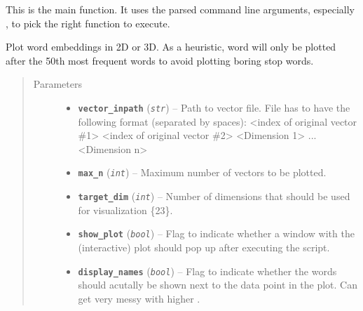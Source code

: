 \documentclass[letterpaper,10pt,english]{sphinxmanual}
\begin{document}

\begin{fulllineitems}
\label{src.eval:src.eval.eval_vectors.main}
This is the main function. It uses the parsed command line arguments, especially , to pick the right
function to execute.

\end{fulllineitems}


\begin{fulllineitems}
\label{src.eval:src.eval.eval_vectors.plot}
Plot word embeddings in 2D or 3D. As a heuristic, word will only be plotted after the 50th most frequent words to
avoid plotting boring stop words.
\begin{quote}\begin{description}
\item[{Parameters}] \leavevmode\begin{itemize}
\item {} 
\textbf{\texttt{vector\_inpath}} (\emph{\texttt{str}}) -- Path to vector file. File has to have the following format (separated by spaces):
\textless{}index of original vector \#1\textgreater{} \textless{}index of original vector \#2\textgreater{} \textless{}Dimension 1\textgreater{} ... \textless{}Dimension n\textgreater{}

\item {} 
\textbf{\texttt{max\_n}} (\emph{\texttt{int}}) -- Maximum number of vectors to be plotted.

\item {} 
\textbf{\texttt{target\_dim}} (\emph{\texttt{int}}) -- Number of dimensions that should be used for visualization \{2\textbar{}3\}.

\item {} 
\textbf{\texttt{show\_plot}} (\emph{\texttt{bool}}) -- Flag to indicate whether a window with the (interactive) plot should pop up after executing
the script.

\item {} 
\textbf{\texttt{display\_names}} (\emph{\texttt{bool}}) -- Flag to indicate whether the words should acutally be shown next to the data point in
the plot. Can get very messy with higher .

\end{itemize}

\end{description}\end{quote}

\end{fulllineitems}
\end{document}
